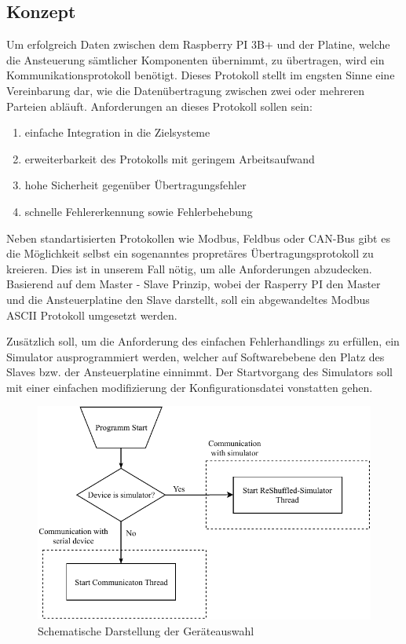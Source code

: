 \subsection{Konzept}

Um erfolgreich Daten zwischen dem Raspberry PI 3B+ und der Platine, welche die Ansteuerung sämtlicher Komponenten übernimmt, zu übertragen, wird ein Kommunikationsprotokoll benötigt.
Dieses Protokoll stellt im engsten Sinne eine Vereinbarung dar, wie die Datenübertragung zwischen zwei oder mehreren Parteien abläuft. Anforderungen an dieses Protokoll sollen sein:
\begin{enumerate}
    \item einfache Integration in die Zielsysteme
    \item erweiterbarkeit des Protokolls mit geringem Arbeitsaufwand
    \item hohe Sicherheit gegenüber Übertragungsfehler
    \item schnelle Fehlererkennung sowie Fehlerbehebung
\end{enumerate}
Neben standartisierten Protokollen wie Modbus, Feldbus oder CAN-Bus gibt es die Möglichkeit selbst ein sogenanntes propretäres Übertragungsprotokoll zu kreieren. Dies ist in unserem Fall nötig, um alle Anforderungen abzudecken.
Basierend auf dem Master - Slave Prinzip, wobei der Rasperry PI den Master und die Ansteuerplatine den Slave darstellt, soll ein abgewandeltes Modbus ASCII Protokoll umgesetzt werden.

Zusätzlich soll, um die Anforderung des einfachen Fehlerhandlings zu erfüllen, ein Simulator ausprogrammiert werden, welcher auf Softwarebebene den Platz des Slaves bzw. der Ansteuerplatine einnimmt.
Der Startvorgang des Simulators soll mit einer einfachen modifizierung der Konfigurationsdatei vonstatten gehen.

\begin{figure}[H]
    \centering
    \includegraphics[width=1\textwidth]{fig/ainf/DeviceSelection}
    \caption{Schematische Darstellung der Geräteauswahl}
\end{figure}

